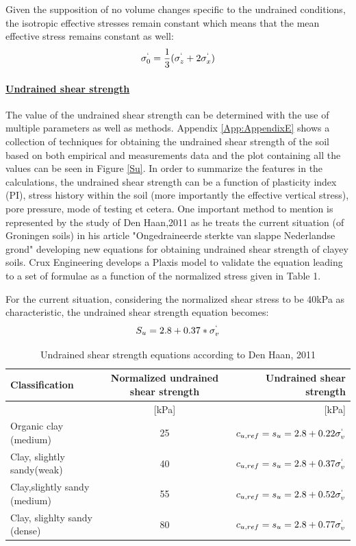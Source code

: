 \documentclass[12pt,a4paper]{report}
\begin{document}
Given the supposition of no volume changes specific to the undrained conditions, the isotropic effective stresses remain constant which means that the mean effective stress remains constant as well:
\begin{equation}
	\sigma^`_0=\frac{1}{3}(\sigma^`_z+2\sigma^`_x)
\end{equation}

\paragraph{\underline{Undrained shear strength}}
The value of the undrained shear strength can be determined with the use of multiple parameters as well as methods. Appendix \ref{App:AppendixE} shows a collection of techniques for obtaining the undrained shear strength of the soil based on both empirical and measurements data and the plot containing all the values can be seen in Figure \ref{Su}. In order to summarize the features in the calculations, the undrained shear strength can be a function of plasticity index (PI), stress history within the soil (more importantly the effective  vertical stress), pore pressure, mode of testing et cetera.
One important method to mention is represented by the study of Den Haan,2011 \cite{den2011ongedraineerde} as he treats the current situation (of Groningen soils) in his article "Ongedraineerde sterkte van slappe Nederlandse grond" developing new equations for obtaining undrained shear strength of clayey soils. Crux Engineering develops a Plaxis model to validate the equation leading to a set of formulae as a function of the normalized stress given in Table 1.

For the current situation, considering the normalized shear stress to be 40kPa as characteristic, the undrained shear strength equation becomes:
\begin{equation}
	S_u=2.8+0.37*\sigma^`_v
\end{equation}

\begin{table}[h!]
	\centering
	\begin{tabular}{|l|c|r|}
		\hline Classification       &      Normalized undrained shear strength   &  Undrained shear strength\\
		\hline [-]  &  [kPa]  & [kPa]   \\ 
		\hline Organic clay (medium)    & 25 &  $c_{u,ref} =s_u=2.8+0.22\sigma^`_v$ \\ 
		\hline Clay, slightly sandy(weak)  & 40  &   $c_{u,ref} =s_u=2.8+0.37\sigma^`_v$   \\ 
		\hline Clay,slightly sandy (medium) &  55  &  $c_{u,ref} =s_u=2.8+0.52\sigma^`_v$     \\ 
		\hline Clay, slighlty sandy (dense) & 80  &  $c_{u,ref} =s_u=2.8+0.77\sigma^`_v$     \\ 
		\hline
	\end{tabular}

	\caption{Undrained shear strength equations according to Den Haan, 2011 \cite{den2011ongedraineerde}}
	\label{DenHaan_param}
\end{table}
\end{document}
